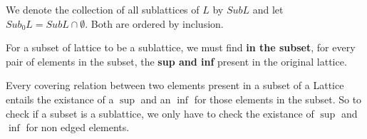 \begin{notation} We denote the collection of all sublattices of $L$ by $SubL$
and let $Sub_0 L = Sub L \cap \emptyset$. Both are ordered by inclusion.
\end{notation}

\begin{interpretation} For a subset of lattice to be a sublattice, we must find
\textbf{in the subset}, for every pair of elements in the subset, the
\textbf{sup and inf} present in the original lattice.
\end{interpretation}

\begin{remark} Every covering relation between two elements present in a subset
of a Lattice entails the existance of a $\sup$ and an $\inf$ for those elements
in the subset. So to check if a subset is a sublattice, we only have to check
the existance of $\sup$ and $\inf$ for non edged elements.
\end{remark}

